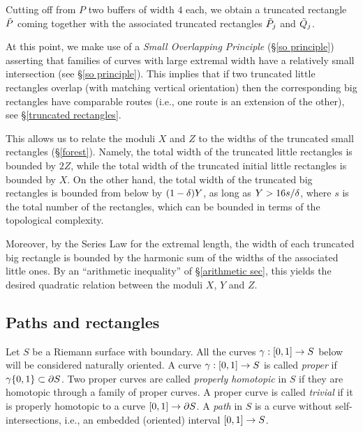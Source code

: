 Cutting off from $P$ two buffers of width $4$ each, we obtain a truncated rectangle $\tilde P$ coming
together with the associated truncated rectangles $\tilde P_j$ and $\tilde Q_j$.

At this point, we make use of a {\it Small Overlapping Principle} (\S \ref{so principle}) 
asserting  that families of curves with large extremal width have a relatively small intersection
(see \S \ref{so principle}). This implies that if two truncated little  rectangles overlap
(with matching vertical orientation) then the corresponding big rectangles have
comparable routes (i.e., one route is an extension of the other), see \S \ref{truncated rectangles}. 

This allows us to relate the moduli $X$ and $Z$ to the widths of the truncated small rectangles (\S \ref{forest}).
Namely, the total width of the truncated little rectangles is bounded by $2Z$, 
while the total width of the truncated initial little rectangles is bounded by $X$.  
On the other hand, the total width of the truncated big rectangles is bounded from below by
$(1-{\delta}) Y$, as long as $Y > 16 s/{\delta}$, where $s$ is the total number of the rectangles,
which can be bounded in terms of the topological complexity.
 

Moreover, by the Series Law for the extremal length, the width of each truncated big rectangle is bounded by the
harmonic sum of the widths of the associated little ones.  By an ``arithmetic inequality'' 
of \S \ref{arithmetic sec}, this yields the desired quadratic relation between the moduli $X$, $Y$ and $Z$. 

 

\subsection{Paths and rectangles}\label{paths and rectangles} 
Let $S$ be a Riemann surface with  boundary.
All the curves  $\gamma: [0,1]\rightarrow  S $ below will be considered naturally oriented. 
A curve $\gamma: [0,1]\rightarrow  S $ is called {\it proper} if  $\gamma \{0,1\}\subset \partial S$. 
Two proper curves are called {\it properly homotopic} in $S$  %
if they are homotopic through a family of proper curves.
 A proper curve is called {\it trivial} if it is properly homotopic to a curve $[0,1]\rightarrow \partial S$. 
A {\it path}  in $S$ is a curve without self-intersections, 
i.e.,  an embedded (oriented) interval $[0,1]\rightarrow S$.

